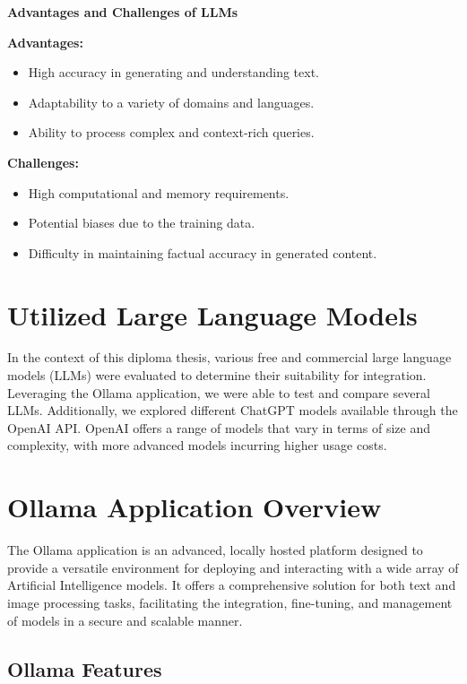 \textbf{Advantages and Challenges of LLMs}

\textbf{Advantages:}
\begin{itemize}
\item High accuracy in generating and understanding text.
\item Adaptability to a variety of domains and languages.
\item Ability to process complex and context-rich queries.
\end{itemize}

\textbf{Challenges:}
\begin{itemize}
\item High computational and memory requirements.
\item Potential biases due to the training data.
\item Difficulty in maintaining factual accuracy in generated content.
\end{itemize}

\cite{what-are-LLMs-IBM}

\section{Utilized Large Language Models}

In the context of this diploma thesis, various free and commercial large language models (LLMs) 
were evaluated to determine their suitability for integration. Leveraging the Ollama application, we were able to test and compare several LLMs. 
Additionally, we explored different ChatGPT models available through the OpenAI API.
OpenAI offers a range of models that vary in terms of size and complexity, with more advanced models incurring higher usage costs.
\cite{OpenAI_API_overview}


\section{Ollama Application Overview}

The Ollama application is an advanced, locally hosted platform designed to provide a versatile environment for deploying and interacting with a wide array of Artificial Intelligence models. It offers a comprehensive solution for both text and image processing tasks, facilitating the integration, fine-tuning, and management of models in a secure and scalable manner.
\cite{WhatisOllama}

\subsection{Ollama Features}

